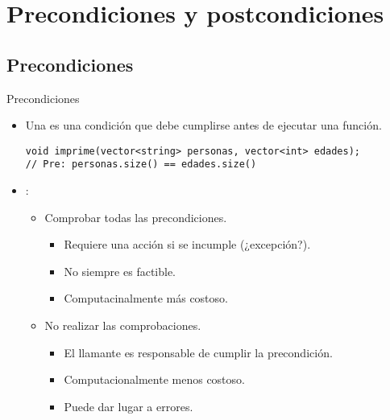 \section{Precondiciones y postcondiciones}

\subsection{Precondiciones}

\begin{frame}[t,fragile]{Precondiciones}
\begin{itemize}
  \item Una  es una condición que debe cumplirse
        antes de ejecutar una función.
\begin{lstlisting}
void imprime(vector<string> personas, vector<int> edades);
// Pre: personas.size() == edades.size()
\end{lstlisting}

  \item {}:
    \begin{itemize}
      \item Comprobar todas las precondiciones.
        \begin{itemize}
          \item Requiere una acción si se incumple (¿excepción?).
          \item No siempre es factible.
          \item Computacinalmente más costoso.
        \end{itemize}
      \item No realizar las comprobaciones.
        \begin{itemize}
          \item El llamante es responsable de cumplir la precondición.
          \item Computacionalmente menos costoso.
          \item Puede dar lugar a errores.
        \end{itemize}
    \end{itemize}
\end{itemize}
\end{frame}

